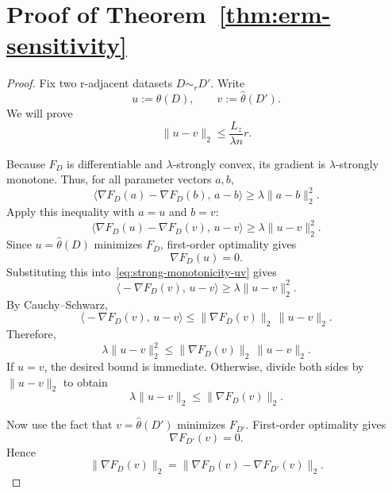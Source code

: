 \documentclass[conference,compsoc]{IEEEtran}
\begin{document}
\section{Proof of Theorem~\ref{thm:erm-sensitivity}}
\label{app:proof-erm-sensitivity}

\begin{proof}
Fix two r-adjacent datasets $D\sim_r D'$. Write
\[
u:=\hat\theta(D),
\qquad
v:=\hat\theta(D').
\]
We will prove
\[
\|u-v\|_2\le \frac{L_z}{\lambda n}r.
\]

Because $F_D$ is differentiable and $\lambda$-strongly convex, its gradient is $\lambda$-strongly monotone. Thus, for all parameter vectors $a,b$,
\[
\big\langle \nabla F_D(a)-\nabla F_D(b),\,a-b\big\rangle
\ge
\lambda\|a-b\|_2^2.
\]
Apply this inequality with $a=u$ and $b=v$:
\begin{equation}
\label{eq:strong-monotonicity-uv}
\big\langle \nabla F_D(u)-\nabla F_D(v),\,u-v\big\rangle
\ge
\lambda\|u-v\|_2^2.
\end{equation}
Since $u=\hat\theta(D)$ minimizes $F_D$, first-order optimality gives
\[
\nabla F_D(u)=0.
\]
Substituting this into~\eqref{eq:strong-monotonicity-uv} gives
\[
\big\langle -\nabla F_D(v),\,u-v\big\rangle
\ge
\lambda\|u-v\|_2^2.
\]
By Cauchy--Schwarz,
\[
\big\langle -\nabla F_D(v),\,u-v\big\rangle
\le
\|\nabla F_D(v)\|_2\,\|u-v\|_2.
\]
Therefore,
\[
\lambda\|u-v\|_2^2
\le
\|\nabla F_D(v)\|_2\,\|u-v\|_2.
\]
If $u=v$, the desired bound is immediate. Otherwise, divide both sides by $\|u-v\|_2$ to obtain
\begin{equation}
\label{eq:distance-controlled-by-gradient}
\lambda\|u-v\|_2
\le
\|\nabla F_D(v)\|_2.
\end{equation}

Now use the fact that $v=\hat\theta(D')$ minimizes $F_{D'}$. First-order optimality gives
\[
\nabla F_{D'}(v)=0.
\]
Hence
\begin{equation}
\label{eq:gradient-rewrite}
\|\nabla F_D(v)\|_2
=
\|\nabla F_D(v)-\nabla F_{D'}(v)\|_2.
\end{equation}


\end{proof}
\end{document}
